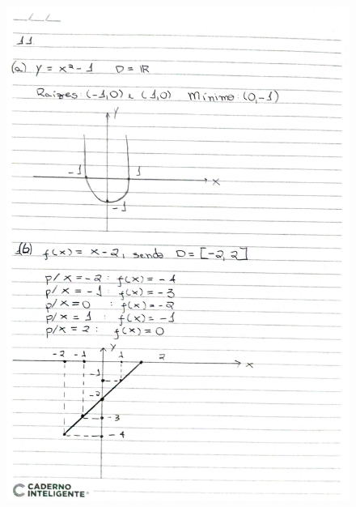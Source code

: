 \documentclass[
  12pt,     %
  openright,      %
  oneside,      %
  a4paper     %
  ]{abntex2}
\begin{document}
\begin{figure}[H]
  \centering
  \includegraphics[scale=0.23]{pagina6.jpg}
\end{figure}
\end{document}
